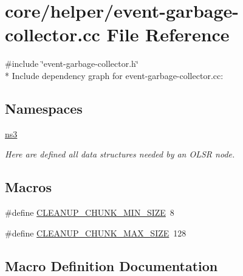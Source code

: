 \hypertarget{event-garbage-collector_8cc}{}\section{core/helper/event-\/garbage-\/collector.cc File Reference}
\label{event-garbage-collector_8cc}
{\ttfamily \#include \char`\"{}event-\/garbage-\/collector.\+h\char`\"{}}\\*
Include dependency graph for event-\/garbage-\/collector.cc\+:
\subsection*{Namespaces}
\begin{DoxyCompactItemize}
\item 
 \hyperlink{namespacens3}{ns3}
\begin{DoxyCompactList}\small\item\em Here are defined all data structures needed by an O\+L\+SR node. \end{DoxyCompactList}\end{DoxyCompactItemize}
\subsection*{Macros}
\begin{DoxyCompactItemize}
\item 
\#define \hyperlink{event-garbage-collector_8cc_a2123daf9d44155d01f73117618fa56b5}{C\+L\+E\+A\+N\+U\+P\+\_\+\+C\+H\+U\+N\+K\+\_\+\+M\+I\+N\+\_\+\+S\+I\+ZE}~8
\item 
\#define \hyperlink{event-garbage-collector_8cc_a3ac506aedf612f30bca65b7dfd0288f0}{C\+L\+E\+A\+N\+U\+P\+\_\+\+C\+H\+U\+N\+K\+\_\+\+M\+A\+X\+\_\+\+S\+I\+ZE}~128
\end{DoxyCompactItemize}


\subsection{Macro Definition Documentation}
